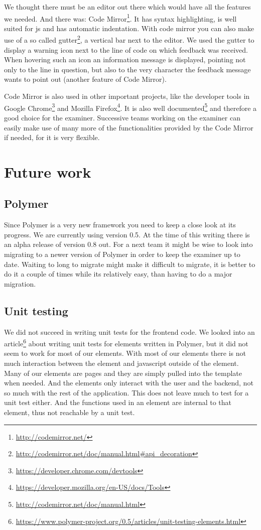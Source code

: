 We thought there must be an editor out there
which would have all the features we needed.
And there was: Code Mirror\footnote{\url{http://codemirror.net/}}.
It has syntax highlighting,
is well suited for \gls{js}
and has automatic indentation.
With code mirror you can also make use of a so called
gutter\footnote{\url{http://codemirror.net/doc/manual.html\#api_decoration}},
a vertical bar next to the editor.
We used the gutter to display a warning icon next to the line of code
on which feedback was received.
When hovering such an icon an information message is displayed,
pointing not only to the line in question,
but also to the very character the feedback message wants to point out
(another feature of Code Mirror).

Code Mirror is also used in other important projects,
like the developer tools in
Google Chrome\footnote{\url{https://developer.chrome.com/devtools}} and
Mozilla Firefox\footnote{\url{https://developer.mozilla.org/en-US/docs/Tools}}.
It is also
well documented\footnote{\url{http://codemirror.net/doc/manual.html}}
and therefore a good choice for the \gls{examiner}.
Successive teams working on the \gls{examiner}
can easily make use of many more of
the functionalities provided by the Code Mirror if needed,
for it is very flexible.

\section{Future work}

\subsection{Polymer}
Since Polymer is a very new framework
you need to keep a close look at its progress.
We are currently using version 0.5.
At the time of this writing there is an alpha release of version 0.8 out.
For a next team it might be wise to look into
migrating to a newer version of Polymer
in order to keep the \gls{examiner} up to date.
Waiting to long to migrate might make it difficult to migrate,
it is better to do it a couple of times while its relatively easy,
than having to do a major migration.

\subsection{Unit testing}
We did not succeed in writing unit tests for the frontend code.
We looked into
an article\footnote{\url{https://www.polymer-project.org/0.5/articles/unit-testing-elements.html}}
about writing unit tests
for elements written in Polymer,
but it did not seem to work for most of our elements.
With most of our elements there is not much interaction
between the element and javascript outside of the element.
Many of our elements are pages
and they are simply pulled into the template when needed.
And the elements only interact with the user and the backend,
not so much with the rest of the application.
This does not leave much to test for a unit test either.
And the functions used in an element are internal to that element,
thus not reachable by a unit test.

